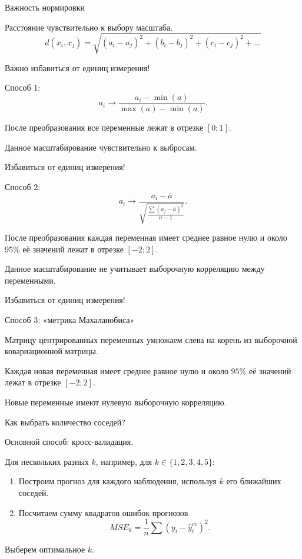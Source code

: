 \begin{frame}{Важность нормировки}

Расстояние \alert{чувствительно} к выбору масштаба.
\[
d(x_i, x_j) = \sqrt{(a_i - a_j)^2 + (b_i - b_j)^2 + (c_i - c_j)^2 + \ldots}  
\]

\pause

\alert{Важно} избавиться от единиц измерения!

\pause
Способ 1:
\[
a_i \to  \frac{a_i - \min(a)}{\max(a) - \min(a)}.
\]


\pause 

После преобразования все переменные лежат в отрезке $[0;1]$.

\pause

Данное масштабирование чувствительно к выбросам. 

\end{frame}


\begin{frame}{Избавиться от единиц измерения!}

  Способ 2:
  \[
  a_i \to \frac{a_i - \bar a}{\sqrt{\frac{\sum (a_j - \bar a)^2}{n - 1}}}.
  \]
  
  \pause 
  
  После преобразования каждая переменная имеет среднее равное нулю и 
  около 95\% её значений лежат в отрезке $[-2;2]$.
  
  \pause
  
  Данное масштабирование не учитывает выборочную корреляцию между переменными. 
  
\end{frame}



\begin{frame}{Избавиться от единиц измерения!}

  Способ 3: «метрика Махаланобиса»
  
  Матрицу центрированных переменных умножаем слева на корень из выборочной ковариационной матрицы.

\pause

Каждая новая переменная имеет среднее равное нулю и 
около $95\%$ её значений лежат в отрезке $[-2; 2]$.

\pause 
Новые переменные имеют нулевую выборочную корреляцию. 

\end{frame}


\begin{frame}{Как выбрать количество соседей?}

Основной способ: \alert{кросс-валидация}. 

\pause 
Для нескольких разных $k$, например, для $k \in \{1, 2, 3, 4, 5 \}$:

\begin{enumerate}[<+->]

\item Построим прогноз для каждого наблюдения, используя $k$ его ближайших соседей. 
\item Посчитаем сумму квадратов ошибок прогнозов
\[
  MSE_{k} = \frac{1}{n}\sum (y_i - \hat y_i^{cv})^2.
\]
\end{enumerate}
\pause
Выберем \alert{оптимальное} $k$.
\end{frame}



